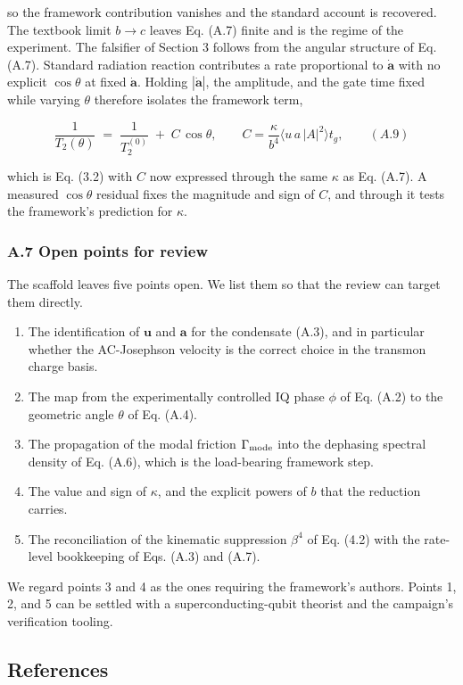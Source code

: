 \documentclass[
  11pt,
]{article}
\providecommand{\tightlist}{%
  \setlength{\itemsep}{0pt}\setlength{\parskip}{0pt}}
\begin{document}
so the framework contribution vanishes and the standard account is
recovered. The textbook limit \(b\to c\) leaves Eq. (A.7) finite and is
the regime of the experiment. The falsifier of Section 3 follows from
the angular structure of Eq. (A.7). Standard radiation reaction
contributes a rate proportional to \(\dot{\mathbf a}\) with no explicit
\(\cos\theta\) at fixed \(\dot{\mathbf a}\). Holding
\(|\dot{\mathbf a}|\), the amplitude, and the gate time fixed while
varying \(\theta\) therefore isolates the framework term,

\[
\frac{1}{T_2(\theta)} \;=\; \frac{1}{T_2^{(0)}} \;+\; C\,\cos\theta, \qquad C=\frac{\kappa}{b^4}\Big\langle u\,a\,|A|^2\Big\rangle t_g, \qquad (A.9)
\]

which is Eq. (3.2) with \(C\) now expressed through the same \(\kappa\)
as Eq. (A.7). A measured \(\cos\theta\) residual fixes the magnitude and
sign of \(C\), and through it tests the framework's prediction for
\(\kappa\).

\hypertarget{a.7-open-points-for-review}{%
\subsubsection{A.7 Open points for
review}\label{a.7-open-points-for-review}}

The scaffold leaves five points open. We list them so that the review
can target them directly.

\begin{enumerate}
\def\labelenumi{\arabic{enumi}.}
\tightlist
\item
  The identification of \(\mathbf{u}\) and \(\mathbf{a}\) for the
  condensate (A.3), and in particular whether the AC-Josephson velocity
  is the correct choice in the transmon charge basis.
\item
  The map from the experimentally controlled IQ phase \(\phi\) of Eq.
  (A.2) to the geometric angle \(\theta\) of Eq. (A.4).
\item
  The propagation of the modal friction \(\Gamma_{\rm mode}\) into the
  dephasing spectral density of Eq. (A.6), which is the load-bearing
  framework step.
\item
  The value and sign of \(\kappa\), and the explicit powers of \(b\)
  that the reduction carries.
\item
  The reconciliation of the kinematic suppression \(\beta^4\) of Eq.
  (4.2) with the rate-level bookkeeping of Eqs. (A.3) and (A.7).
\end{enumerate}

We regard points 3 and 4 as the ones requiring the framework's authors.
Points 1, 2, and 5 can be settled with a superconducting-qubit theorist
and the campaign's verification tooling.

\hypertarget{references}{%
\subsection{References}\label{references}}
\end{document}
